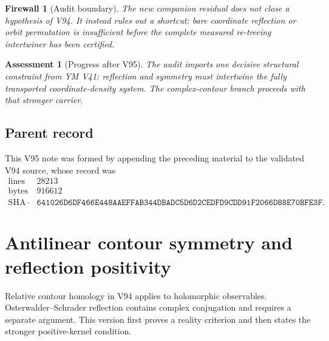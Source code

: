\documentclass[11pt]{article}
\newtheorem{assessment}[theorem]{Assessment}
\newtheorem{firewall}[theorem]{Firewall}
\begin{document}
\begin{firewall}[Audit boundary]
\label{fire:v11v95-boundary}
The new companion residual does not close a hypothesis of V94.
It instead rules out a shortcut: bare coordinate reflection or orbit
permutation is insufficient before the complete measured re-treeing
intertwiner has been certified.
\end{firewall}

\begin{assessment}[Progress after V95]
\label{ass:v11v95-status}
The audit imports one decisive structural constraint from YM V41:
reflection and symmetry must intertwine the fully transported
coordinate-density system.  The complex-contour branch proceeds with
that stronger carrier.
\end{assessment}

\subsection{Parent record}

This V95 note was formed by appending the preceding material to the
validated V94 source, whose record was
\[
\begin{array}{c|c}
\text{lines}&28213\\
\text{bytes}&916612\\
\text{SHA--256}&
\texttt{641026D6DF466E448AAEFFAB344DBADC5D6D2CEDFD9CDD91F2066D88E70BFE3F}.
\end{array}                                                     \tag{95.4}
\]


\section{Antilinear contour symmetry and reflection positivity}
\label{sec:v11v96}

Relative contour homology in V94 applies to holomorphic observables.
Osterwalder--Schrader reflection contains complex conjugation and
requires a separate argument.  This version first proves a reality
criterion and then states the stronger positive-kernel condition.
\end{document}

